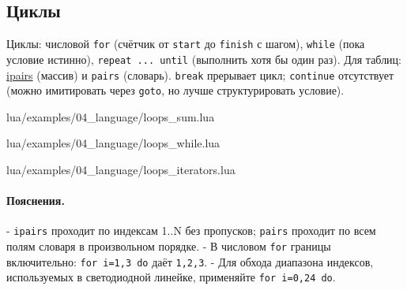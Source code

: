 \subsection{Циклы}
Циклы: числовой \verb|for| (счётчик от \verb|start| до \verb|finish| с шагом), \verb|while| (пока условие истинно), \verb|repeat ... until| (выполнить хотя бы один раз). Для таблиц: \hyperlink{term:ipairs}{ipairs} (массив) и \verb|pairs| (словарь). \verb|break| прерывает цикл; \verb|continue| отсутствует (можно имитировать через \verb|goto|, но лучше структурировать условие).
\begin{codefile}{lua/examples/04_language/loops_sum.lua}
\end{codefile}
\begin{codefile}{lua/examples/04_language/loops_while.lua}
\end{codefile}
\begin{codefile}{lua/examples/04_language/loops_iterators.lua}
\end{codefile}
\paragraph{Пояснения.}
- \verb|ipairs| проходит по индексам 1..N без пропусков; \verb|pairs| проходит по всем полям словаря в произвольном порядке.
- В числовом \verb|for| границы включительно: \verb|for i=1,3 do| даёт \verb|1,2,3|.
- Для обхода диапазона индексов, используемых в светодиодной линейке, применяйте \verb|for i=0,24 do|.
